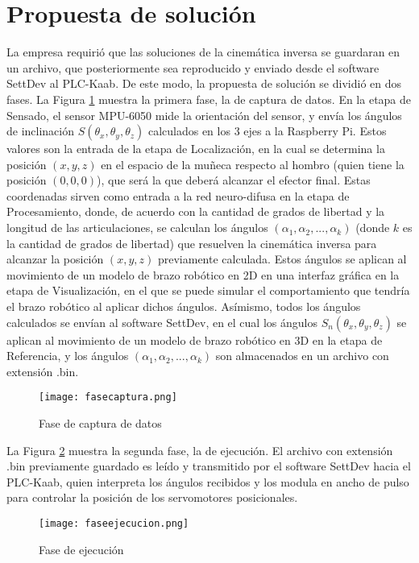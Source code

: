 \section{Propuesta de solución}

La empresa requirió que las soluciones de la cinemática inversa se guardaran en un archivo, que posteriormente sea reproducido y enviado desde el software SettDev al PLC-Kaab. De este modo, la propuesta de solución se dividió en dos fases. La Figura \ref{fig:fasecaptura} muestra la primera fase, la de captura de datos. En la etapa de Sensado, el sensor MPU-6050 mide la orientación del sensor, y envía los ángulos de inclinación $S(\theta_x, \theta_y, \theta_z)$ calculados en los 3 ejes a la Raspberry Pi. Estos valores son la entrada de la etapa de Localización, en la cual se determina la posición $(x, y, z)$ en el espacio de la muñeca respecto al hombro (quien tiene la posición $(0, 0, 0)$), que será la que deberá alcanzar el efector final. Estas coordenadas sirven como entrada a la red neuro-difusa en la etapa de Procesamiento, donde, de acuerdo con la cantidad de grados de libertad y la longitud de las articulaciones, se calculan los ángulos $(\alpha_1, \alpha_2, ..., \alpha_k)$ (donde $k$ es la cantidad de grados de libertad) que resuelven la cinemática inversa para alcanzar la posición $(x, y, z)$ previamente calculada. Estos ángulos se aplican al movimiento de un modelo de brazo robótico en 2D en una interfaz gráfica en la etapa de Visualización, en el que se puede simular el comportamiento que tendría el brazo robótico al aplicar dichos ángulos. Asímismo, todos los ángulos calculados se envían al software SettDev, en el cual los ángulos $S_n(\theta_x, \theta_y, \theta_z)$ se aplican al movimiento de un modelo de brazo robótico en 3D en la etapa de Referencia, y los ángulos $(\alpha_1, \alpha_2, ..., \alpha_k)$ son almacenados en un archivo con extensión .bin.

\begin{figure}[htb]
	\centering
	\texttt{[image: fasecaptura.png]}
	\caption{Fase de captura de datos}
	\label{fig:fasecaptura}
\end{figure}

\newpage
La Figura \ref{fig:faseejecucion} muestra la segunda fase, la de ejecución. El archivo con extensión .bin previamente guardado es leído y transmitido por el software SettDev hacia el PLC-Kaab, quien interpreta los ángulos recibidos y los modula en ancho de pulso para controlar la posición de los servomotores posicionales.

\begin{figure}[htb]
	\centering
	\texttt{[image: faseejecucion.png]}
	\caption{Fase de ejecución}
	\label{fig:faseejecucion}
\end{figure}